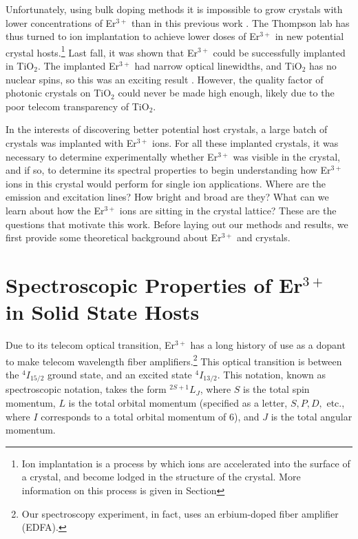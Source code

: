 \documentclass[12pt]{report}
\newcommand{\erbium}[1][ ]{Er$^{3+}$#1}
\newcommand{\TiO}[1][ ]{TiO$_{2}$#1}
\begin{document}
Unfortunately, using bulk doping methods it is impossible to grow crystals with lower concentrations of \erbium than in this previous work \cite{Dibos2018}. The Thompson lab has thus turned to ion implantation to achieve lower doses of \erbium in new potential crystal hosts.\footnote{Ion implantation is a process by which ions are accelerated into the surface of a crystal, and become lodged in the structure of the crystal. More information on this process is given in Section } Last fall, it was shown that \erbium could be successfully implanted in \TiO[]. The implanted \erbium had narrow optical linewidths, and \TiO has no nuclear spins, so this was an exciting result \cite{Phenicie2019}. However, the quality factor of photonic crystals on \TiO could never be made high enough, likely due to the poor telecom transparency of \TiO[].

In the interests of discovering better potential host crystals, a large batch of crystals was implanted with \erbium ions. For all these implanted crystals, it was necessary to determine experimentally whether \erbium was visible in the crystal, and if so, to determine its spectral properties to begin understanding how \erbium ions in this crystal would perform for single ion applications. Where are the emission and excitation lines? How bright and broad are they? What can we learn about how the \erbium ions are sitting in the crystal lattice? These are the questions that motivate this work. Before laying out our methods and results, we first provide some theoretical background about \erbium and crystals.

\section{Spectroscopic Properties of \erbium in Solid State Hosts}
\label{sec:spectr-prop-erbi}

Due to its telecom optical transition, \erbium has a long history of use as a dopant to make telecom wavelength fiber amplifiers.\footnote{Our spectroscopy experiment, in fact, uses an erbium-doped fiber amplifier (EDFA).} This optical transition is between the $^{4}I_{15/2}$ ground state, and an excited state $^{4}I_{13/2}$. This notation, known as spectroscopic notation, takes the form $^{2S+1}L_{J}$, where $S$ is the total spin momentum, $L$ is the total orbital momentum (specified as a letter, $S, P, D,$ etc., where $I$ corresponds to a total orbital momentum of 6), and $J$ is the total angular momentum. 
\end{document}
